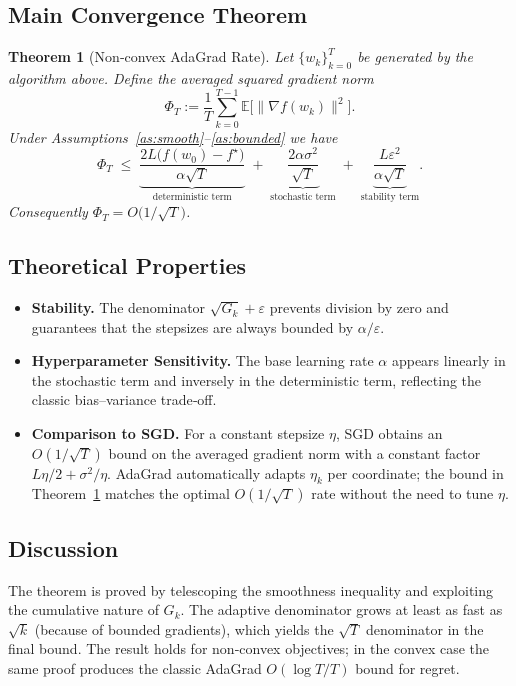 \documentclass{article}
\newtheorem{theorem}{Theorem}
\newcommand{\E}{\mathbb{E}}
\begin{document}
\subsection*{Main Convergence Theorem}
\begin{theorem}[Non‑convex AdaGrad Rate]\label{thm:main}
Let $\{w_{k}\}_{k=0}^{T}$ be generated by the algorithm above.
Define the averaged squared gradient norm
\[
\Phi_{T}:=\frac{1}{T}\sum_{k=0}^{T-1}\E\bigl[\|\nabla f(w_{k})\|^{2}\bigr].
\]
Under Assumptions~\ref{as:smooth}--\ref{as:bounded} we have
\[
\Phi_{T}\;\le\;
\underbrace{\frac{2L\bigl(f(w_{0})-f^{\star}\bigr)}{\alpha\sqrt{T}}}_{\text{deterministic term}}
\;+\;
\underbrace{\frac{2\alpha\sigma^{2}}{\sqrt{T}}}_{\text{stochastic term}}
\;+\;
\underbrace{\frac{L\varepsilon^{2}}{\alpha\sqrt{T}}}_{\text{stability term}} .
\]
Consequently $\Phi_{T}=O\!\bigl(1/\sqrt{T}\bigr)$.
\end{theorem}

\subsection*{Theoretical Properties}
\begin{itemize}
\item \textbf{Stability.} The denominator $\sqrt{G_{k}}+\varepsilon$ prevents division
by zero and guarantees that the stepsizes are always bounded by $\alpha/\varepsilon$.
\item \textbf{Hyperparameter Sensitivity.}
  The base learning rate $\alpha$ appears linearly in the stochastic term
  and inversely in the deterministic term, reflecting the classic bias–variance trade‑off.
\item \textbf{Comparison to SGD.}
  For a constant stepsize $\eta$, SGD obtains an $O(1/\sqrt{T})$ bound on the
  averaged gradient norm with a constant factor $L\eta/2+\sigma^{2}/\eta$.
  AdaGrad automatically adapts $\eta_{k}$ per coordinate; the bound in Theorem~\ref{thm:main}
  matches the optimal $O(1/\sqrt{T})$ rate without the need to tune $\eta$.
\end{itemize}

\subsection*{Discussion}
The theorem is proved by telescoping the smoothness inequality and exploiting the
cumulative nature of $G_{k}$.  The adaptive denominator grows at least as fast as
$\sqrt{k}$ (because of bounded gradients), which yields the $\sqrt{T}$ denominator in the final bound.
The result holds for non‑convex objectives; in the convex case the same proof
produces the classic AdaGrad $O(\log T / T)$ bound for regret.
\end{document}

